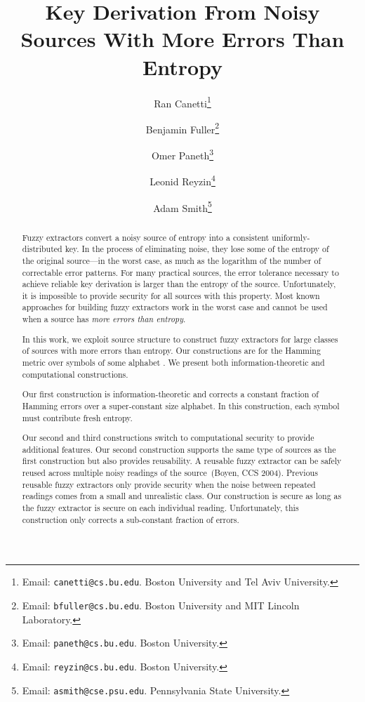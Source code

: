 \documentclass[11pt]{article}
\title{Key Derivation From Noisy Sources With More Errors Than Entropy}
\author{Ran Canetti\footnote{Email: {\tt canetti@cs.bu.edu}. Boston University and Tel Aviv University.} \and Benjamin Fuller\footnote{Email: {\tt bfuller@cs.bu.edu}.  Boston University and MIT Lincoln Laboratory.} \and Omer Paneth\footnote{Email: {\tt paneth@cs.bu.edu}. Boston University.} \and Leonid Reyzin\footnote{Email: {\tt reyzin@cs.bu.edu}.  Boston University.} \and Adam Smith\footnote{Email: {\tt asmith@cse.psu.edu}.  Pennsylvania State University.} }
\begin{document}
\maketitle


\begin{abstract}
Fuzzy extractors convert a noisy source of entropy into a consistent uniformly-distributed key.  In the process of eliminating noise, they  lose some of the entropy of the original source---in the worst case, as much as the logarithm of the number of correctable error patterns. For many practical sources, the error tolerance necessary to achieve reliable key derivation is larger than the entropy of the source.  Unfortunately, it is impossible to provide security for all sources with this property.  Most known approaches for building fuzzy extractors work in the worst case and cannot be used when a source has \emph{more errors than entropy}.  

In this work, we exploit source structure to construct fuzzy extractors for large classes of sources with more errors than entropy.  Our constructions are for the Hamming metric over symbols of some alphabet .  We present both information-theoretic and computational constructions.

Our first construction is information-theoretic and corrects a constant fraction of Hamming errors over a super-constant size alphabet.  In this construction, each symbol must contribute fresh entropy.  

Our second and third constructions switch to computational security to provide additional features.  Our second construction supports the same type of sources as the first construction but also provides reusability.  A reusable fuzzy extractor can be safely reused across multiple noisy readings of the source~(Boyen, CCS 2004).  Previous reusable fuzzy extractors only provide security when the noise between repeated readings comes from a small and unrealistic class. Our construction is secure as long as the fuzzy extractor is secure on each individual reading. Unfortunately, this construction only corrects a sub-constant fraction of errors.  %


\end{abstract}
\end{document}
